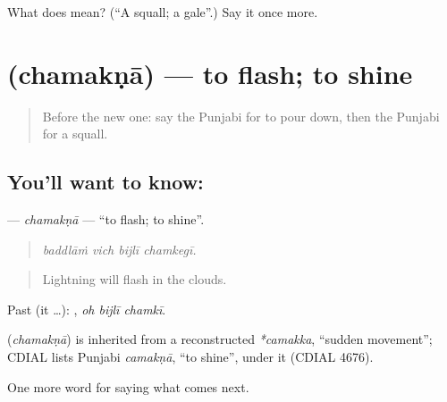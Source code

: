 \begin{tcolorbox}[breakable,colback=teal!4,colframe=teal!35!black,title={Before you move on}]
What does  mean? (\textquotedblleft{}A squall; a gale\textquotedblright{}.) Say it once more.
\end{tcolorbox}
\section[\texorpdfstring{\pa{ਚਮਕਣਾ} (chamakṇā)}{ਚਮਕਣਾ (chamakṇā)}]{ (chamakṇā) — to flash; to shine}

\label{lesson:PA-C286-chamakna}



\begin{quote}
Before the new one: say the Punjabi for to pour down, then the Punjabi for a squall.
\end{quote}

\subsection*{You'll want to know: }
\textbf{} — \emph{chamakṇā} — \textquotedblleft{}to flash; to shine\textquotedblright{}.

\begin{quote}
   
\end{quote}

\begin{quote}
\emph{baddlāṁ vich bijlī chamkegī.}
\end{quote}

\begin{quote}
Lightning will flash in the clouds.
\end{quote}

Past (it …):   , \emph{oh bijlī chamkī}.

\begin{cousinweb}
\textbf{} (\emph{chamakṇā}) is inherited from a reconstructed \emph{*camakka}, \textquotedblleft{}sudden movement\textquotedblright{}; CDIAL lists Punjabi \emph{camakṇā}, \textquotedblleft{}to shine\textquotedblright{}, under it (CDIAL 4676).
\end{cousinweb}

\begin{grammarlens}[title={What you've built}]
One more word for saying what comes next.
\end{grammarlens}

